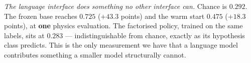 \emph{The language interface does something no other interface can.} Chance is $0.292$. The frozen base
reaches $0.725$ ($+43.3$ points) and the warm start $0.475$ ($+18.3$ points), at \textbf{one} physics
evaluation. The factorised policy, trained on the same labels, sits at $0.283$ --- indistinguishable from
chance, exactly as its hypothesis class predicts. This is the only measurement we
have that a language model contributes something a smaller model structurally cannot.

